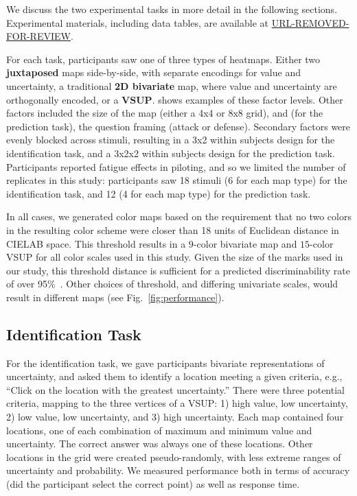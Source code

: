 We discuss the two experimental tasks in more detail in the following sections. Experimental materials, including data tables, are available at \url{URL-REMOVED-FOR-REVIEW}.

For each task, participants saw one of three types of heatmaps. Either two \textbf{juxtaposed} maps side-by-side, with separate encodings for value and uncertainty, a traditional \textbf{2D bivariate} map, where value and uncertainty are orthogonally encoded, or a \textbf{VSUP}.  shows examples of these factor levels. Other factors included the size of the map (either a 4x4 or 8x8 grid), and (for the prediction task), the question framing (attack or defense). Secondary factors were evenly blocked across stimuli, resulting in a 3x2 within subjects design for the identification task, and a 3x2x2 within subjects design for the prediction task. Participants reported fatigue effects in piloting, and so we limited the number of replicates in this study: participants saw 18 stimuli (6 for each map type) for the identification task, and 12 (4 for each map type) for the prediction task. 

In all cases, we generated color maps based on the requirement that no two colors in the resulting color scheme were closer than 18 units of Euclidean distance in CIELAB space. This threshold results in a $9$-color bivariate map and $15$-color VSUP for all color scales used in this study. Given the size of the marks used in our study, this threshold distance is sufficient for a predicted discriminability rate of over 95\%~\cite{stone2014engineering}. Other choices of threshold, and differing univariate scales, would result in different maps (see Fig.~\ref{fig:performance}).


\subsection{Identification Task}

For the identification task, we gave participants bivariate representations of uncertainty, and asked them to identify a location meeting a given criteria, e.g., ``Click on the location with the greatest uncertainty.'' There were three potential criteria, mapping to the three vertices of a VSUP: 1) high value, low uncertainty, 2) low value, low uncertainty, and 3) high uncertainty. Each map contained four locations, one of each combination of maximum and minimum value and uncertainty. The correct answer was always one of these locations. Other locations in the grid were created pseudo-randomly, with less extreme ranges of uncertainty and probability. We measured performance both in terms of accuracy (did the participant select the correct point) as well as response time.


